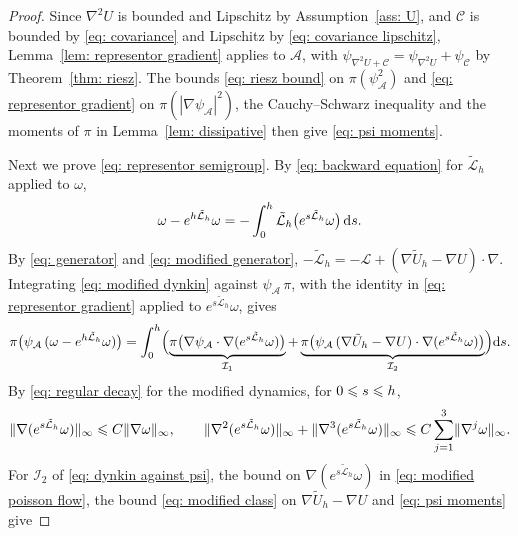 \begin{proof}
    Since $\nabla^2 U$ is bounded and Lipschitz by Assumption~\ref{ass: U}, and $\mathcal C$ is bounded by \eqref{eq: covariance} and Lipschitz by \eqref{eq: covariance lipschitz}, Lemma~\ref{lem: representor gradient} applies to $\mathcal A$, with $\psi_{\nabla^2 U + \mathcal C} = \psi_{\nabla^2 U} + \psi_{\mathcal C}$ by Theorem~\ref{thm: riesz}. The bounds \eqref{eq: riesz bound} on $\pi( \psi_{\mathcal A}^2 )$ and \eqref{eq: representor gradient} on $\pi( |\nabla \psi_{\mathcal A}|^2 )$, the Cauchy--Schwarz inequality and the moments of $\pi$ in Lemma~\ref{lem: dissipative} then give \eqref{eq: psi moments}.

    Next we prove \eqref{eq: representor semigroup}. By \eqref{eq: backward equation} for $\tilde{\mathcal L}_h$ applied to $\omega$,
    \begin{equation}
        \omega - e^{h\tilde{\mathcal L}_h} \omega = -\int_0^h \tilde{\mathcal L}_h \bigl( e^{s\tilde{\mathcal L}_h} \omega \bigr)\, \mathrm{d} s .
        \label{eq: modified dynkin}
    \end{equation}
    By \eqref{eq: generator} and \eqref{eq: modified generator}, $-\tilde{\mathcal L}_h = -\mathcal L + ( \nabla \tilde U_h - \nabla U ) \cdot \nabla$. Integrating \eqref{eq: modified dynkin} against $\psi_{\mathcal A}\, \pi$, with the identity in \eqref{eq: representor gradient} applied to $e^{s\tilde{\mathcal L}_h} \omega$, gives
    \begin{equation}
        \pi\bigl( \psi_{\mathcal A}\, ( \omega - e^{h\tilde{\mathcal L}_h} \omega ) \bigr) = \int_0^h \Bigl( \underbrace{\pi\bigl( \nabla \psi_{\mathcal A} \cdot \nabla ( e^{s\tilde{\mathcal L}_h} \omega ) \bigr)}_{\mathcal I_1} + \underbrace{\pi\bigl( \psi_{\mathcal A}\, ( \nabla \tilde U_h - \nabla U ) \cdot \nabla ( e^{s\tilde{\mathcal L}_h} \omega ) \bigr)}_{\mathcal I_2} \Bigr) \mathrm{d} s .
        \label{eq: dynkin against psi}
    \end{equation}
    By \eqref{eq: regular decay} for the modified dynamics, for $0 \leqslant s \leqslant h$,
    \begin{equation}
        \lVert \nabla ( e^{s\tilde{\mathcal L}_h} \omega ) \rVert_\infty \leqslant C \lVert \nabla \omega \rVert_\infty , \qquad \lVert \nabla^2 ( e^{s\tilde{\mathcal L}_h} \omega ) \rVert_\infty + \lVert \nabla^3 ( e^{s\tilde{\mathcal L}_h} \omega ) \rVert_\infty \leqslant C \sum_{j=1}^{3} \lVert \nabla^j \omega \rVert_\infty .
        \label{eq: modified poisson flow}
    \end{equation}
    For $\mathcal I_2$ of \eqref{eq: dynkin against psi}, the bound on $\nabla ( e^{s\tilde{\mathcal L}_h} \omega )$ in \eqref{eq: modified poisson flow}, the bound \eqref{eq: modified class} on $\nabla \tilde U_h - \nabla U$ and \eqref{eq: psi moments} give

\end{proof}
